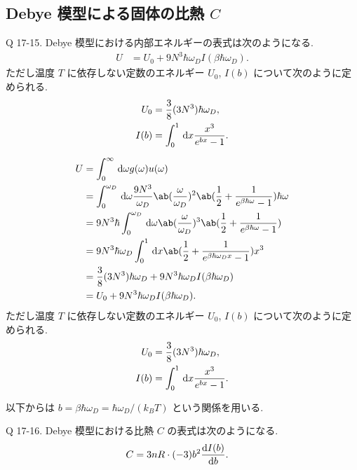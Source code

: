 \documentclass[uplatex,diffipdfmx,a4paper,11pt]{jlreq}
\theoremstyle{definition}
\begin{document}
\subsection{Debye 模型による固体の比熱 $C$}
\begin{itembox}[l]{Q 17-15.}
  Debye 模型における内部エネルギーの表式は次のようになる.
  \begin{align}
    U & = U_0 + 9N^3\hbar\omega_DI(\beta\hbar\omega_D).
  \end{align}
  ただし温度 $T$ に依存しない定数のエネルギー $U_0$, $I(b)$ について次のように定められる.
  \begin{align}
    U_0  & = \frac{3}{8}(3N^3)\hbar\omega_D,       \\
    I(b) & = \int_0^1\dl{x}\frac{x^3}{e^{bx} - 1}.
  \end{align}
\end{itembox}
\begin{align}
  U & = \int_0^\infty\dl{\omega}g(\omega)u(\omega)                                                                                                      \\
    & = \int_0^{\omega_D}\dl{\omega}\frac{9N^3}{\omega_D}\ab(\frac{\omega}{\omega_D})^2\ab(\frac{1}{2} + \frac{1}{e^{\beta\hbar\omega} - 1})\hbar\omega \\
    & = 9N^3\hbar\int_0^{\omega_D}\dl{\omega}\ab(\frac{\omega}{\omega_D})^3\ab(\frac{1}{2} + \frac{1}{e^{\beta\hbar\omega} - 1})                        \\
    & = 9N^3\hbar\omega_D\int_0^1\dl{x}\ab(\frac{1}{2} + \frac{1}{e^{\beta\hbar\omega_Dx} - 1})x^3                                                      \\
    & = \frac{3}{8}(3N^3)\hbar\omega_D + 9N^3\hbar\omega_DI(\beta\hbar\omega_D)                                                                         \\
    & = U_0 + 9N^3\hbar\omega_DI(\beta\hbar\omega_D).
\end{align}
ただし温度 $T$ に依存しない定数のエネルギー $U_0$, $I(b)$ について次のように定められる.
\begin{align}
  U_0  & = \frac{3}{8}(3N^3)\hbar\omega_D,       \\
  I(b) & = \int_0^1\dl{x}\frac{x^3}{e^{bx} - 1}.
\end{align}

以下からは $b = \beta\hbar\omega_D = \hbar\omega_D/(k_BT)$ という関係を用いる.

\begin{itembox}[l]{Q 17-16.}
  Debye 模型における比熱 $C$ の表式は次のようになる.
  \begin{align}
    C & = 3nR\cdot(-3)b^2\diff{I(b)}{b}.
  \end{align}
\end{itembox}
\end{document}

